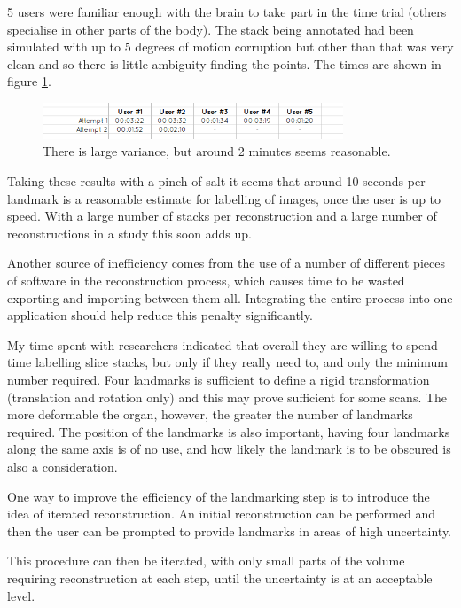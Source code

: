 5 users were familiar enough with the brain to take part in the time trial (others specialise in other parts of the body). The stack being annotated had been simulated with up to 5 degrees of motion corruption but other than that was very clean and so there is little ambiguity finding the points. The times are shown in figure \ref{fig:landmarktimes}. 

\begin{figure}[h]
    \centering
  \includegraphics[width=0.8\textwidth]{images/evaluation/graph_reconstruction_landmark_times.png}
    \caption{There is large variance, but around 2 minutes seems reasonable.}\label{fig:landmarktimes}
\end{figure}

Taking these results with a pinch of salt it seems that around 10 seconds per landmark is a reasonable estimate for labelling of images, once the user is up to speed. With a large number of stacks per reconstruction and a large number of reconstructions in a study this soon adds up.

Another source of inefficiency comes from the use of a number of different pieces of software in the reconstruction process, which causes time to be wasted exporting and importing between them all. Integrating the entire process into one application should help reduce this penalty significantly.

My time spent with researchers indicated that overall they are willing to spend time labelling slice stacks, but only if they really need to, and only the minimum number required. Four landmarks is sufficient to define a rigid transformation (translation and rotation only) and this may prove sufficient for some scans. The more deformable the organ, however, the greater the number of landmarks required. The position of the landmarks is also important, having four landmarks along the same axis is of no use, and how likely the landmark is to be obscured is also a consideration.

One way to improve the efficiency of the landmarking step is to introduce the idea of iterated reconstruction. An initial reconstruction can be performed and then the user can be prompted to provide landmarks in areas of high uncertainty.

This procedure can then be iterated, with only small parts of the volume requiring reconstruction at each step, until the uncertainty is at an acceptable level.

